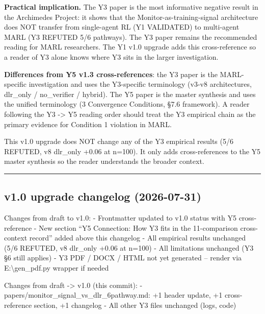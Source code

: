 \documentclass[
]{article}
\begin{document}
\textbf{Practical implication.} The Y3 paper is the most informative
negative result in the Archimedes Project: it shows that the
Monitor-as-training-signal architecture does NOT transfer from
single-agent RL (Y1 VALIDATED) to multi-agent MARL (Y3 REFUTED 5/6
pathways). The Y3 paper remains the recommended reading for MARL
researchers. The Y1 v1.0 upgrade adds this cross-reference so a reader
of Y3 alone knows where Y3 sits in the larger investigation.

\textbf{Differences from Y5 v1.3 cross-references}: the Y3 paper is the
MARL-specific investigation and uses the Y3-specific terminology (v3-v8
architectures, dlr\_only / no\_verifier / hybrid). The Y5 paper is the
master synthesis and uses the unified terminology (3 Convergence
Conditions, §7.6 framework). A reader following the Y3 -\textgreater{}
Y5 reading order should treat the Y3 empirical chain as the primary
evidence for Condition 1 violation in MARL.

This v1.0 upgrade does NOT change any of the Y3 empirical results (5/6
REFUTED, v8 dlr\_only +0.06 at n=100). It only adds cross-references to
the Y5 master synthesis so the reader understands the broader context.

\begin{center}\rule{0.5\linewidth}{0.5pt}\end{center}

\subsection{v1.0 upgrade changelog
(2026-07-31)}\label{v1.0-upgrade-changelog-2026-07-31}

Changes from draft to v1.0: - Frontmatter updated to v1.0 status with Y5
cross-reference - New section ``Y5 Connection: How Y3 fits in the
11-comparison cross-context record'' added above this changelog - All
empirical results unchanged (5/6 REFUTED, v8 dlr\_only +0.06 at n=100) -
All limitations unchanged (Y3 §6 still applies) - Y3 PDF / DOCX / HTML
not yet generated -- render via E:\textbackslash gen\_pdf.py wrapper if
needed

Changes from draft -\textgreater{} v1.0 (this commit): -
papers/monitor\_signal\_vs\_dlr\_6pathway.md: +1 header update, +1
cross-reference section, +1 changelog - All other Y3 files unchanged
(logs, code)
\end{document}
